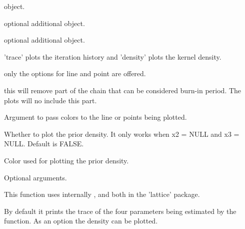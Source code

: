 \documentclass[letterpaper]{book}
\begin{document}
\begin{Arguments}
\begin{ldescription}
\item[\code{x}]  object.

\item[\code{x2}] optional additional 
object.

\item[\code{x3}] optional additional 
object.

\item[\code{plot.kind}] 'trace' plots the iteration history and
'density' plots the kernel density.

\item[\code{type}] only the options for line and point are
offered.

\item[\code{burnin}] this will remove part of the chain that can
be considered burn-in period.  The plots will no include
this part.

\item[\code{cols}] Argument to pass colors to the line or points
being plotted.

\item[\code{prior}] Whether to plot the prior density. It only
works when x2 = NULL and x3 = NULL. Default is FALSE.

\item[\code{pcol}] Color used for plotting the prior density.

\item[\code{...}] Optional arguments.
\end{ldescription}
\end{Arguments}
%
\begin{Details}\relax
This function uses internally
,
 and
 both in the
'lattice' package.
\end{Details}
%
\begin{SeeAlso}\relax
{}
\end{SeeAlso}
%
\begin{Description}\relax
By default it prints the trace of the four parameters being
estimated by the  function. As an
option the density can be plotted.
\end{Description}
\end{document}
